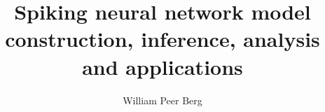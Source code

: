 \documentclass[mphil,deptreport,ianc]{infthesis} %
\begin{document}
\begin{preliminary}

\title{Spiking neural network model construction, inference, analysis and applications}

\author{William Peer Berg}




\end{preliminary}
\end{document}

